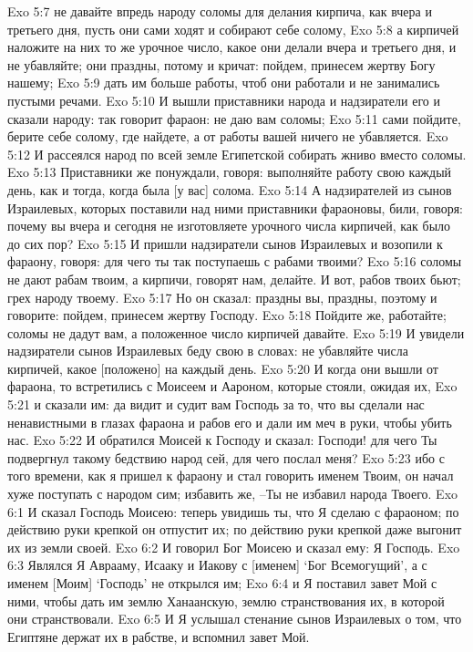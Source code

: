 Exo 5:7  не давайте впредь народу соломы для делания кирпича, как вчера и третьего дня, пусть они сами ходят и собирают себе солому,
Exo 5:8  а кирпичей наложите на них то же урочное число, какое они делали вчера и третьего дня, и не убавляйте; они праздны, потому и кричат: пойдем, принесем жертву Богу нашему;
Exo 5:9  дать им больше работы, чтоб они работали и не занимались пустыми речами.
Exo 5:10  И вышли приставники народа и надзиратели его и сказали народу: так говорит фараон: не даю вам соломы;
Exo 5:11  сами пойдите, берите себе солому, где найдете, а от работы вашей ничего не убавляется.
Exo 5:12  И рассеялся народ по всей земле Египетской собирать жниво вместо соломы.
Exo 5:13  Приставники же понуждали, говоря: выполняйте работу свою каждый день, как и тогда, когда была [у вас] солома.
Exo 5:14  А надзирателей из сынов Израилевых, которых поставили над ними приставники фараоновы, били, говоря: почему вы вчера и сегодня не изготовляете урочного числа кирпичей, как было до сих пор?
Exo 5:15  И пришли надзиратели сынов Израилевых и возопили к фараону, говоря: для чего ты так поступаешь с рабами твоими?
Exo 5:16  соломы не дают рабам твоим, а кирпичи, говорят нам, делайте. И вот, рабов твоих бьют; грех народу твоему.
Exo 5:17  Но он сказал: праздны вы, праздны, поэтому и говорите: пойдем, принесем жертву Господу.
Exo 5:18  Пойдите же, работайте; соломы не дадут вам, а положенное число кирпичей давайте.
Exo 5:19  И увидели надзиратели сынов Израилевых беду свою в словах: не убавляйте числа кирпичей, какое [положено] на каждый день.
Exo 5:20  И когда они вышли от фараона, то встретились с Моисеем и Аароном, которые стояли, ожидая их,
Exo 5:21  и сказали им: да видит и судит вам Господь за то, что вы сделали нас ненавистными в глазах фараона и рабов его и дали им меч в руки, чтобы убить нас.
Exo 5:22  И обратился Моисей к Господу и сказал: Господи! для чего Ты подвергнул такому бедствию народ сей, для чего послал меня?
Exo 5:23  ибо с того времени, как я пришел к фараону и стал говорить именем Твоим, он начал хуже поступать с народом сим; избавить же, --Ты не избавил народа Твоего.
Exo 6:1  И сказал Господь Моисею: теперь увидишь ты, что Я сделаю с фараоном; по действию руки крепкой он отпустит их; по действию руки крепкой даже выгонит их из земли своей.
Exo 6:2  И говорил Бог Моисею и сказал ему: Я Господь.
Exo 6:3  Являлся Я Аврааму, Исааку и Иакову с [именем] `Бог Всемогущий', а с именем [Моим] `Господь' не открылся им;
Exo 6:4  и Я поставил завет Мой с ними, чтобы дать им землю Ханаанскую, землю странствования их, в которой они странствовали.
Exo 6:5  И Я услышал стенание сынов Израилевых о том, что Египтяне держат их в рабстве, и вспомнил завет Мой.

